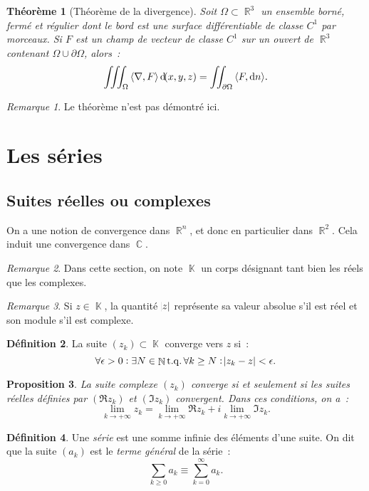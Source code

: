 \documentclass{article}
\DeclareMathOperator{\C}{\mathbb C}
\DeclareMathOperator{\K}{\mathbb K}
\DeclareMathOperator{\N}{\mathbb N}
\DeclareMathOperator{\R}{\mathbb R}
\DeclareMathOperator{\tq}{ t.q. }
\newcommand{\scpr}[2]{{\left\langle#1, #2\right\rangle}}
\newcommand{\divg}[1]{\scpr \nabla {#1}}
\newtheorem{thm}{Théorème}[section]
\newtheorem{prp}[thm]{Proposition}
\theoremstyle{definition}
\newtheorem{déf}[thm]{Définition}
\theoremstyle{remark}
\newtheorem*{rmq}{Remarque}
\begin{document}
		\begin{thm}[Théorème de la divergence]\label{thm:divergence} Soit $\Omega \subset \R^3$ un ensemble borné, fermé et régulier dont le bord est une surface
		différentiable de classe $C^1$ par morceaux. Si $F$ est un champ de vecteur de classe $C^1$ sur un ouvert de $\R^3$ contenant $\Omega \cup \partial \Omega$,
		alors~:
		\[\iiint_\Omega\divg F\dif (x, y, z) = \iint_{\partial \Omega}\scpr F{\dif n}.\]
		\end{thm}

		\begin{rmq} Le théorème n'est pas démontré ici. \end{rmq}

\newpage
\section{Les séries}\label{sec:séries}
	\subsection{Suites réelles ou complexes}
		On a une notion de convergence dans $\R^n$, et donc en particulier dans $\R^2$. Cela induit une convergence dans $\C$.

		\begin{rmq} Dans cette section, on note $\K$ un corps désignant tant bien les réels que les complexes. \end{rmq}

		\begin{rmq} Si $z \in \K$, la quantité $\abs z$ représente sa valeur absolue s'il est réel et son module s'il est complexe. \end{rmq}

		\begin{déf} La suite $(z_k) \subset \K$ converge vers $z$ si~:
		\[\forall \epsilon > 0 : \exists N \in \N \tq \forall k \geq N : \abs {z_k-z} < \epsilon.\]
		\end{déf}

		\begin{prp} La suite complexe $(z_k)$ converge si et seulement si les suites réelles définies par $(\Re z_k)$ et $(\Im z_k)$ convergent.
		Dans ces conditions, on a~:
		\[\lim_{k \to +\infty}z_k = \lim_{k \to +\infty}\Re z_k + i\lim_{k \to +\infty}\Im z_k.\]
		\end{prp}

		\begin{déf} Une \emph{série} est une somme infinie des éléments d'une suite. On dit que la suite $(a_k)$ est le \emph{terme général} de la série~:
		\[\sum_{k \geq 0}a_k \equiv \sum_{k=0}^\infty a_k.\]
		\end{déf}
\end{document}
